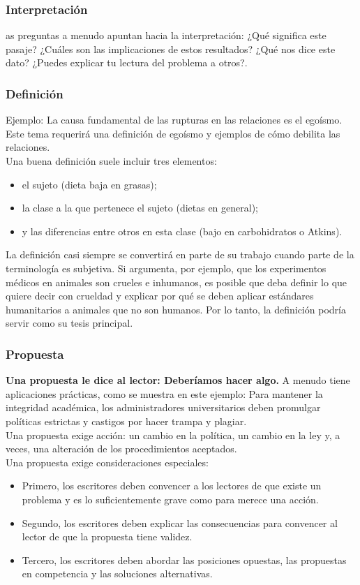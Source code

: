 \subsubsection{Interpretación}
as preguntas a menudo apuntan hacia la interpretación: ¿Qué significa este pasaje? ¿Cuáles son las implicaciones de estos resultados? ¿Qué nos dice este dato? ¿Puedes explicar tu lectura del problema a otros?.\\

\subsubsection{Definición}
Ejemplo: La causa fundamental de las rupturas en las relaciones es el egoísmo. Este tema requerirá una definición de egoísmo y ejemplos de cómo debilita las relaciones.\\
Una buena definición suele incluir tres elementos: 
\begin{itemize}
    \item el sujeto (dieta baja en grasas); 
    \item la clase a la que pertenece el sujeto (dietas en general); 
    \item y las diferencias entre otros en esta clase (bajo en carbohidratos o Atkins). 
\end{itemize}
La definición casi siempre se convertirá en parte de su trabajo cuando parte de la terminología es subjetiva. Si argumenta, por ejemplo, que los experimentos médicos en animales son crueles e inhumanos, es posible que deba definir lo que quiere decir con crueldad y explicar por qué se deben aplicar estándares humanitarios a animales que no son humanos. Por lo tanto, la definición podría servir como su tesis principal. 

\subsubsection{Propuesta}
\textbf{Una propuesta le dice al lector: Deberíamos hacer algo.} A menudo tiene aplicaciones prácticas, como se muestra en este ejemplo: Para mantener la integridad académica, los administradores universitarios deben promulgar políticas estrictas y castigos por hacer trampa y plagiar.\\
Una propuesta exige acción: un cambio en la política, un cambio en la ley y, a veces, una alteración de los procedimientos aceptados.\\
Una propuesta exige consideraciones especiales:
\begin{itemize}
    \item Primero, los escritores deben convencer a los lectores de que existe un problema y es lo suficientemente grave como para merece una acción.
    \item Segundo, los escritores deben explicar las consecuencias para convencer al lector de que la propuesta tiene validez.
    \item Tercero, los escritores deben abordar las posiciones opuestas, las propuestas en competencia y las soluciones alternativas. 
\end{itemize}

